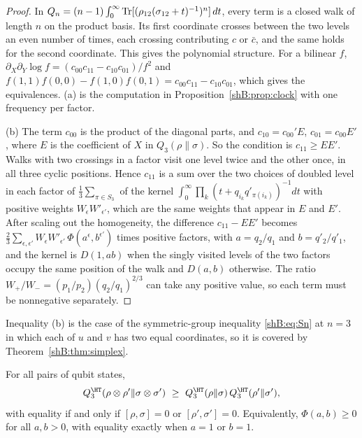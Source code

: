 \begin{proof}
In $Q_n=(n-1)\int_0^\infty\operatorname{Tr}[(\rho_{12}(\sigma_{12}+t)^{-1})^n]\,dt$, every term is a closed walk of length $n$ on the product basis. Its first coordinate crosses between the two levels an even number of times, each crossing contributing $c$ or $\bar c$, and the same holds for the second coordinate. This gives the polynomial structure. For a bilinear $f$, $\partial_X\partial_Y\log f=(c_{00}c_{11}-c_{10}c_{01})/f^2$ and $f(1,1)f(0,0)-f(1,0)f(0,1)=c_{00}c_{11}-c_{10}c_{01}$, which gives the equivalences. (a) is the computation in Proposition~\ref{shB:prop:clock} with one frequency per factor.

(b) The term $c_{00}$ is the product of the diagonal parts, and $c_{10}=c_{00}'E$, $c_{01}=c_{00}E'$, where $E$ is the coefficient of $X$ in $Q_3(\rho\|\sigma)$. So the condition is $c_{11}\ge EE'$. Walks with two crossings in a factor visit one level twice and the other once, in all three cyclic positions. Hence $c_{11}$ is a sum over the two choices of doubled level in each factor of $\frac13\sum_{\pi\in S_3}$ of the kernel $\int_0^\infty\prod_k(t+q_{i_k}q'_{\pi(i_k)})^{-1}dt$ with positive weights $W_\epsilon W'_{\epsilon'}$, which are the same weights that appear in $E$ and $E'$. After scaling out the homogeneity, the difference $c_{11}-EE'$ becomes $\frac23\sum_{\epsilon,\epsilon'}W_\epsilon W'_{\epsilon'}\,\Phi(a^{\epsilon},b^{\epsilon'})$ times positive factors, with $a=q_2/q_1$ and $b=q'_2/q'_1$, and the kernel is $D(1,ab)$ when the singly visited levels of the two factors occupy the same position of the walk and $D(a,b)$ otherwise. The ratio $W_+/W_-=(p_1/p_2)(q_2/q_1)^{2/3}$ can take any positive value, so each term must be nonnegative separately.
\end{proof}

Inequality (b) is the case of the symmetric-group inequality \eqref{shB:eq:Sn} at $n=3$ in which each of $u$ and $v$ has two equal coordinates, so it is covered by Theorem~\ref{shB:thm:simplex}.

\begin{corollary}[Super-multiplicativity at $\alpha=3$ for qubits]\label{shB:thm:qubit3}
For all pairs of qubit states,
\[
Q^\HT_3(\rho\otimes\rho'\|\sigma\otimes\sigma')\ \ge\ Q^\HT_3(\rho\|\sigma)\,Q^\HT_3(\rho'\|\sigma'),
\]
with equality if and only if $[\rho,\sigma]=0$ or $[\rho',\sigma']=0$. Equivalently, $\Phi(a,b)\ge0$ for all $a,b>0$, with equality exactly when $a=1$ or $b=1$.
\end{corollary}

